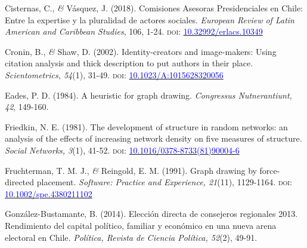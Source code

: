 \documentclass[a4paper]{tufte-handout}
\begin{document}
{\begin{list}{}
\item{\small Cisternas, C., {\itshape \&} Vásquez, J. (2018). Comisiones Asesoras Presidenciales en Chile: Entre la expertise y la pluralidad de actores sociales. {\itshape European Review of Latin American and Caribbean Studies}, 106, 1-24. {\scshape doi}: \href{http://doi.org/10.32992/erlacs.10349}{\textcolor{blue}{10.32992/erlacs.10349}}}

\item{\small Cronin, B., {\itshape \&} Shaw, D. (2002). Identity-creators and image-makers: Using citation analysis and thick description to put authors in their place. {\itshape Scientometrics, 54}(1), 31-49. {\scshape doi}: \href{https://doi.org/10.1023/A:1015628320056}{\textcolor{blue}{10.1023/A:1015628320056}}}

\item{\small Eades, P. D. (1984). A heuristic for graph drawing. {\itshape Congressus Nutnerantiunt, 42}, 149-160.}

\item{\small Friedkin, N. E. (1981). The development of structure in random networks: an analysis of the effects of increasing network density on five measures of structure. {\itshape Social Networks, 3}(1), 41-52. {\scshape doi:} \href{https://doi.org/10.1016/0378-8733(81)90004-6}{\textcolor{blue}{10.1016/0378-8733(81)90004-6}}}

\item{\small Fruchterman, T. M. J., {\itshape \&} Reingold, E. M. (1991). Graph drawing by force-directed placement. {\itshape Software: Practice and Experience, 21}(11), 1129-1164. {\scshape doi:} \href{https://doi.org/10.1002/spe.4380211102}{\textcolor{blue}{10.1002/spe.4380211102}}}


\item{\small Gonz\'alez-Bustamante, B. (2014). Elecci\'on directa de consejeros regionales 2013. Rendimiento del capital pol\'itico, familiar y econ\'omico en una nueva arena electoral en Chile. {\itshape Pol\'itica, Revista de Ciencia Pol\'itica, 52}(2), 49-91.}


\end{list}}
\end{document}
